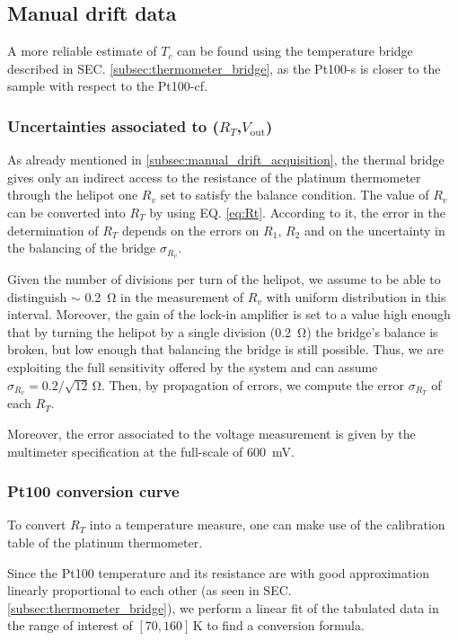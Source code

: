\documentclass[rmp,10pt,onecolumn,fleqn,notitlepage]{revtex4-1}
\begin{document}
\subsection{Manual drift data}
\label{subsec:manual_drift_data}

A more reliable estimate of $T_c$ can be found using the temperature bridge described in SEC. \ref{subsec:thermometer_bridge}, as the Pt100-s is closer to the sample with respect to the Pt100-cf. 


\subsubsection{Uncertainties associated to ($R_T$,$V_{\text{out}}$)}

As already mentioned in \ref{subsec:manual_drift_acquisition}, the thermal bridge gives only an indirect access to the resistance of the platinum thermometer through the helipot one $R_v$ set to satisfy the balance condition. The value of $R_v$ can be converted into $R_T$ by using EQ. \eqref{eq:Rt}. According to it, the error in the determination of $R_T$ depends on the errors on $R_1$, $R_2$ and on the uncertainty in the balancing of the bridge $\sigma_{R_v}$.  

Given the number of divisions per turn of the helipot, we assume to be able to distinguish $\sim$ \SI{0.2}{\ohm} in the measurement of $R_v$ with uniform distribution in this interval. Moreover, the gain of the lock-in amplifier is set to a value high enough that by turning the helipot by a single division (\SI{0.2}{\ohm}) the bridge's balance is broken, but low enough that balancing the bridge is still possible. Thus, we are exploiting the full sensitivity offered by the system and can assume $\sigma_{R_v}= 0.2/\sqrt{12} \, \si{\ohm}$. Then, by propagation of errors, we compute the error $\sigma_{R_T}$ of each $R_T$.

Moreover, the error associated to the voltage measurement is given by the multimeter specification at the full-scale of \SI{600}{\mV}. 


\subsubsection{Pt100 conversion curve}
\label{sec:Pt100_conversion_curve}

To convert $R_T$ into a temperature measure, one can make use of the calibration table of the platinum thermometer.

Since the Pt100 temperature and its resistance are with good approximation linearly proportional to each other (as seen in SEC. \ref{subsec:thermometer_bridge}), we perform a linear fit  of the tabulated data in the range of interest of $[70,160]\,\si{\kelvin}$ to find a conversion formula. 
\end{document}
